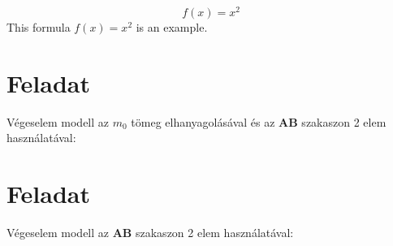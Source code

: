 \documentclass{article}
\begin{document}
	
	

	
	\begin{equation}
	f(x)=x^2
	\end{equation}
	This formula $f(x) = x^2$ is an example.
	
	\section{Feladat}
		
	Végeselem modell az $m_{0}$ tömeg elhanyagolásával és az \textbf{AB} szakaszon 2 elem használatával:
	
	\begin{figure}[h!]		
		\begin{center}	
		\end{center}	
	\caption{}
	\end{figure}
	
	\section{Feladat}
	
	Végeselem modell az \textbf{AB} szakaszon 2 elem használatával:
	
\end{document}
